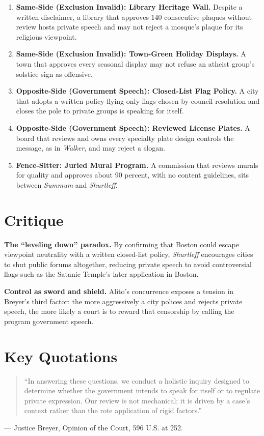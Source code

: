 \documentclass[12pt]{article}
\begin{document}
\begin{enumerate}
\item \textbf{Same-Side (Exclusion Invalid): Library Heritage Wall.} Despite a written disclaimer, a library that approves 140 consecutive plaques without review hosts private speech and may not reject a mosque's plaque for its religious viewpoint.
\item \textbf{Same-Side (Exclusion Invalid): Town-Green Holiday Displays.} A town that approves every seasonal display may not refuse an atheist group's solstice sign as offensive.
\item \textbf{Opposite-Side (Government Speech): Closed-List Flag Policy.} A city that adopts a written policy flying only flags chosen by council resolution and closes the pole to private groups is speaking for itself.
\item \textbf{Opposite-Side (Government Speech): Reviewed License Plates.} A board that reviews and owns every specialty plate design controls the message, as in \textit{Walker}, and may reject a slogan.
\item \textbf{Fence-Sitter: Juried Mural Program.} A commission that reviews murals for quality and approves about 90 percent, with no content guidelines, sits between \textit{Summum} and \textit{Shurtleff}.
\end{enumerate}

\section{Critique}

\textbf{The ``leveling down'' paradox.} By confirming that Boston could escape viewpoint neutrality with a written closed-list policy, \textit{Shurtleff} encourages cities to shut public forums altogether, reducing private speech to avoid controversial flags such as the Satanic Temple's later application in Boston.

\textbf{Control as sword and shield.} Alito's concurrence exposes a tension in Breyer's third factor: the more aggressively a city polices and rejects private speech, the more likely a court is to reward that censorship by calling the program government speech.

\section{Key Quotations}

\begin{quote}
``In answering these questions, we conduct a holistic inquiry designed to determine whether the government intends to speak for itself or to regulate private expression. Our review is not mechanical; it is driven by a case's context rather than the rote application of rigid factors.''
\end{quote}
\noindent --- Justice Breyer, Opinion of the Court, 596 U.S. at 252.
\end{document}
